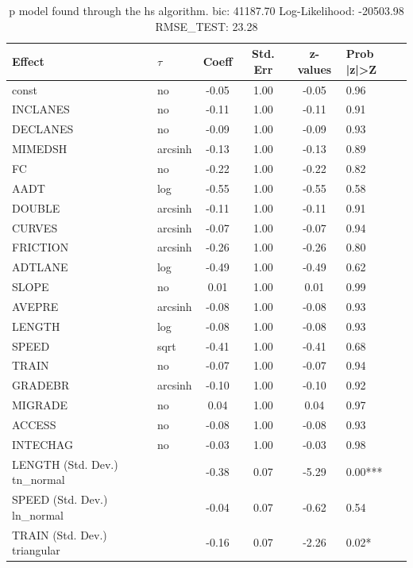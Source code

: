 \begin{table}
	\caption{p model found through the hs algorithm. bic: 41187.70 Log-Likelihood: -20503.98 RMSE_TEST: 23.28}
	\begin{center}
		\begin{tabular}{|l|l|c|c|c|l|}
			\hline
			Effect & $\tau$ & Coeff & Std. Err & z-values & Prob |z|>Z \\
			\hline
			const & no & -0.05 & 1.00 & -0.05 & 0.96 \\
			\hline
			INCLANES & no & -0.11 & 1.00 & -0.11 & 0.91 \\
			\hline
			DECLANES & no & -0.09 & 1.00 & -0.09 & 0.93 \\
			\hline
			MIMEDSH & arcsinh & -0.13 & 1.00 & -0.13 & 0.89 \\
			\hline
			FC & no & -0.22 & 1.00 & -0.22 & 0.82 \\
			\hline
			AADT & log & -0.55 & 1.00 & -0.55 & 0.58 \\
			\hline
			DOUBLE & arcsinh & -0.11 & 1.00 & -0.11 & 0.91 \\
			\hline
			CURVES & arcsinh & -0.07 & 1.00 & -0.07 & 0.94 \\
			\hline
			FRICTION & arcsinh & -0.26 & 1.00 & -0.26 & 0.80 \\
			\hline
			ADTLANE & log & -0.49 & 1.00 & -0.49 & 0.62 \\
			\hline
			SLOPE & no & 0.01 & 1.00 & 0.01 & 0.99 \\
			\hline
			AVEPRE & arcsinh & -0.08 & 1.00 & -0.08 & 0.93 \\
			\hline
			LENGTH & log & -0.08 & 1.00 & -0.08 & 0.93 \\
			\hline
			SPEED & sqrt & -0.41 & 1.00 & -0.41 & 0.68 \\
			\hline
			TRAIN & no & -0.07 & 1.00 & -0.07 & 0.94 \\
			\hline
			GRADEBR & arcsinh & -0.10 & 1.00 & -0.10 & 0.92 \\
			\hline
			MIGRADE & no & 0.04 & 1.00 & 0.04 & 0.97 \\
			\hline
			ACCESS & no & -0.08 & 1.00 & -0.08 & 0.93 \\
			\hline
			INTECHAG & no & -0.03 & 1.00 & -0.03 & 0.98 \\
			\hline
			LENGTH (Std. Dev.) tn_normal &  & -0.38 & 0.07 & -5.29 & 0.00*** \\
			\hline
			SPEED (Std. Dev.) ln_normal &  & -0.04 & 0.07 & -0.62 & 0.54 \\
			\hline
			TRAIN (Std. Dev.) triangular &  & -0.16 & 0.07 & -2.26 & 0.02* \\

\end{tabular}
\end{center}
\end{table}
